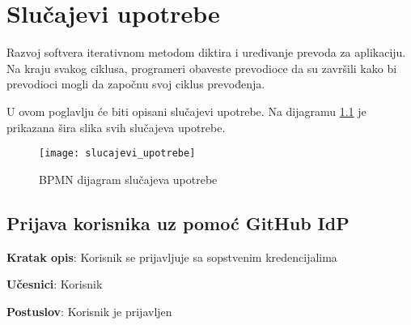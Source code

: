 \chapter{Slučajevi upotrebe}\label{ch:slucajevi_upotrebe}


\renewcommand{\labelenumii}{\arabic{enumi}.\arabic{enumii}}
\renewcommand{\labelenumiii}{\arabic{enumi}.\arabic{enumii}.\arabic{enumiii}}
\renewcommand{\labelenumiv}{\arabic{enumi}.\arabic{enumii}.\arabic{enumiii}.\arabic{enumiv}}

Razvoj softvera iterativnom metodom diktira i uređivanje prevoda za aplikaciju. Na kraju svakog 
ciklusa, programeri obaveste prevodioce da su završili kako bi prevodioci mogli da započnu svoj 
ciklus prevođenja. 

U ovom poglavlju će biti opisani slučajevi upotrebe. Na dijagramu \ref{fig:slucajevi_upotrebe} je 
prikazana šira slika svih slučajeva upotrebe. 

\begin{figure}[H]
    \centering
    \texttt{[image: slucajevi\_upotrebe]}
    \caption{BPMN dijagram slučajeva upotrebe}
    \label{fig:slucajevi_upotrebe}
\end{figure}

\section{Prijava korisnika uz pomoć GitHub IdP}

\textbf{Kratak opis}: Korisnik se prijavljuje sa sopstvenim kredencijalima

\textbf{Učesnici}: Korisnik

\textbf{Postuslov}: Korisnik je prijavljen

